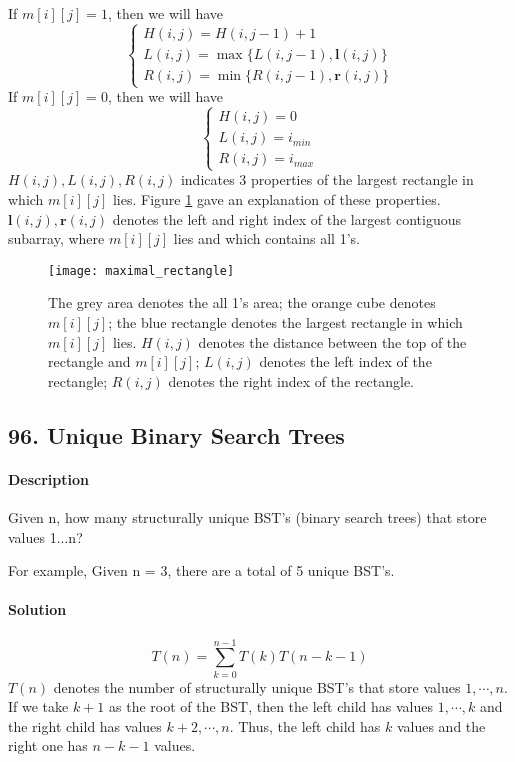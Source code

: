If $m[i][j]=1$, then we will have
\begin{equation*}
\begin{cases}
H(i,j)=H(i,j-1)+1\\
L(i,j)=\max\{L(i,j-1),\bm{l}(i,j)\}\\
R(i,j)=\min\{R(i,j-1),\bm{r}(i,j)\}
\end{cases}
\end{equation*}
If $m[i][j]=0$, then we will have
\begin{equation*}
\begin{cases}
H(i,j)=0\\
L(i,j)=i_{min}\\
R(i,j)=i_{max}
\end{cases}
\end{equation*}
$H(i,j),L(i,j),R(i,j)$ indicates $3$ properties of the largest rectangle in which $m[i][j]$ lies. Figure \ref{fig:maximal_rectangle} gave an explanation of these properties.
$\bm{l}(i,j),\bm{r}(i,j)$ denotes the left and right index of the largest contiguous subarray, where $m[i][j]$ lies and which contains all 1's.
\begin{figure}[ht]
    \centering
    \texttt{[image: maximal\_rectangle]}
    \caption{The grey area denotes the all 1's area; the orange cube denotes $m[i][j]$; the blue rectangle denotes the largest rectangle in which $m[i][j]$ lies. $H(i,j)$ denotes the distance between the top of the rectangle and $m[i][j]$; $L(i,j)$ denotes the left index of the rectangle; $R(i,j)$ denotes the right index of the rectangle.}
    \label{fig:maximal_rectangle}
\end{figure}

\subsection{96. Unique Binary Search Trees}

\paragraph{Description}

Given n, how many structurally unique BST's (binary search trees) that store values 1...n?

For example,
Given n = 3, there are a total of 5 unique BST's.

\paragraph{Solution}
$$T(n)=\sum^{n-1}_{k=0}{T(k)T(n-k-1)}$$
$T(n)$ denotes the number of structurally unique BST's that store values $1,\cdots,n$. If we take $k+1$ as the root of the BST, then the left child has values $1,\cdots,k$ and the right child has values $k+2,\cdots,n$. Thus, the left child has $k$ values and the right one has $n-k-1$ values.

